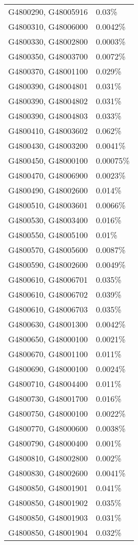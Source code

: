 \begin{longtable}[]{@{}ll@{}}
G4800290, G48005916 & 0.03\% \\
G4800310, G48006000 & 0.0042\% \\
G4800330, G48002800 & 0.0003\% \\
G4800350, G48003700 & 0.0072\% \\
G4800370, G48001100 & 0.029\% \\
G4800390, G48004801 & 0.031\% \\
G4800390, G48004802 & 0.031\% \\
G4800390, G48004803 & 0.033\% \\
G4800410, G48003602 & 0.062\% \\
G4800430, G48003200 & 0.0041\% \\
G4800450, G48000100 & 0.00075\% \\
G4800470, G48006900 & 0.0023\% \\
G4800490, G48002600 & 0.014\% \\
G4800510, G48003601 & 0.0066\% \\
G4800530, G48003400 & 0.016\% \\
G4800550, G48005100 & 0.01\% \\
G4800570, G48005600 & 0.0087\% \\
G4800590, G48002600 & 0.0049\% \\
G4800610, G48006701 & 0.035\% \\
G4800610, G48006702 & 0.039\% \\
G4800610, G48006703 & 0.035\% \\
G4800630, G48001300 & 0.0042\% \\
G4800650, G48000100 & 0.0021\% \\
G4800670, G48001100 & 0.011\% \\
G4800690, G48000100 & 0.0024\% \\
G4800710, G48004400 & 0.011\% \\
G4800730, G48001700 & 0.016\% \\
G4800750, G48000100 & 0.0022\% \\
G4800770, G48000600 & 0.0038\% \\
G4800790, G48000400 & 0.001\% \\
G4800810, G48002800 & 0.002\% \\
G4800830, G48002600 & 0.0041\% \\
G4800850, G48001901 & 0.041\% \\
G4800850, G48001902 & 0.035\% \\
G4800850, G48001903 & 0.031\% \\
G4800850, G48001904 & 0.032\% \\

\end{longtable}
